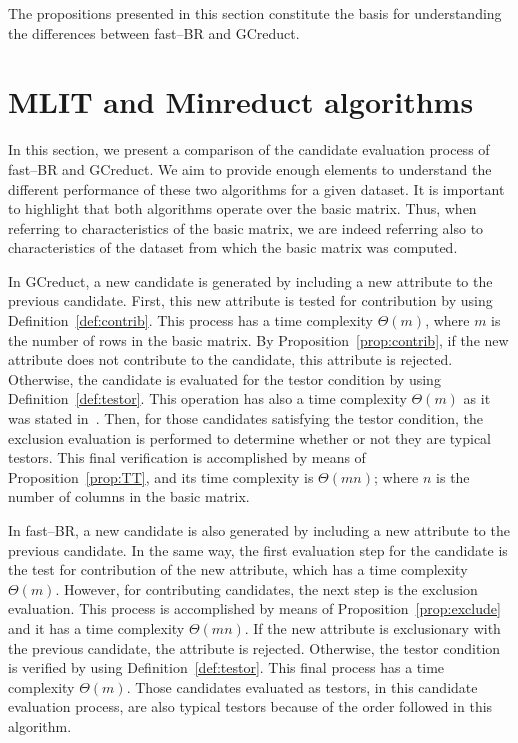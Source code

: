 \documentclass[citenumber]{llncs}
\begin{document}
	The propositions presented in this section constitute the basis for understanding the differences between fast--BR and GCreduct. 
%
\section{MLIT and Minreduct algorithms} \label{Algs}
%
	In this section, we present a comparison of the candidate evaluation process of fast--BR and GCreduct. We aim to provide enough elements to understand the different performance of these two algorithms for a given dataset. It is important to highlight that both algorithms operate over the basic matrix. Thus, when referring to characteristics of the basic matrix, we are indeed referring also to characteristics of the dataset from which the basic matrix was computed.
	
	In GCreduct, a new candidate is generated by including a new attribute to the previous candidate. First, this new attribute is tested for contribution by using Definition~\ref{def:contrib}. This process has a time complexity $\Theta(m)$, where $m$ is the number of rows in the basic matrix. By Proposition~\ref{prop:contrib}, if the new attribute does not contribute to the candidate, this attribute is rejected. Otherwise, the candidate is evaluated for the testor condition by using Definition~\ref{def:testor}. This operation has also a time complexity $\Theta(m)$ as it was stated in~\cite{Rodriguez2018}. Then, for those candidates satisfying the testor condition, the exclusion evaluation is performed to determine whether  or not they are typical testors. This final verification is accomplished by means of Proposition~\ref{prop:TT}, and its time complexity is $\Theta(mn)$; where $n$ is the number of columns in the basic matrix.
	
	In fast--BR, a new candidate is also generated by including a new attribute to the previous candidate. In the same way, the first evaluation step for the candidate is the test for contribution of the new attribute, which has a time complexity $\Theta(m)$. However, for contributing candidates, the next step is the exclusion evaluation. This process is accomplished by means of Proposition~\ref{prop:exclude} and it has a time complexity $\Theta(mn)$. If the new attribute is exclusionary with the previous candidate, the attribute is rejected. Otherwise, the testor condition is verified by using Definition~\ref{def:testor}. This final process has a time complexity $\Theta(m)$. Those candidates evaluated as testors, in this candidate evaluation process, are also typical testors because of the order followed in this algorithm.
	
\end{document}
